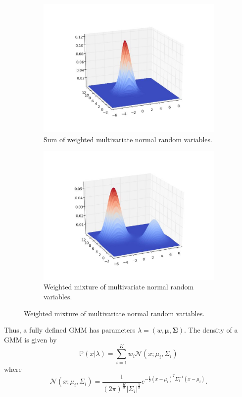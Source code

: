 \begin{figure}[h]
	\label{threedplots}
	\begin{subfigure}[b]{.49\textwidth}
		\centering
		\includegraphics[width=\textwidth]{sum.jpeg}
		\caption{Sum of weighted multivariate normal random variables.}
	\end{subfigure}
	\begin{subfigure}[b]{.49\textwidth}
		\centering
		\includegraphics[width=\textwidth]{gmm.jpeg}
		\caption{Weighted mixture of multivariate normal random variables.}
	\end{subfigure}
\end{figure}

Thus, a fully defined GMM has parameters $\lambda = \left( w, \mathbf{\mu}, \mathbf{\Sigma} \right).$ The density of a GMM is given by $$\mathbb{P}(x | \lambda) = \sum_{i=1}^{K} w_{i} \mathcal{N}(x ; \mu_{i}, \Sigma_{i})$$ where
$$\mathcal{N}(x ; \mu_{i}, \Sigma_{i}) = \frac{1}{(2\pi)^{\frac{K}{2}} |\Sigma_{i}|^{\frac{1}{2}}} e^{-\frac{1}{2} \left(x - \mu_{i} \right)^{T} \Sigma_{i}^{-1} \left(x - \mu_{i} \right)}.$$

